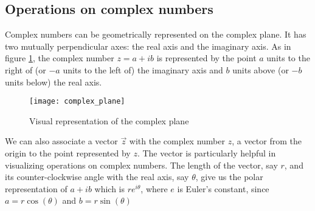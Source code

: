 \documentclass{report}
\begin{document}
\subsection{Operations on complex numbers}
Complex numbers can be geometrically represented on the complex plane. It has two mutually perpendicular axes: the real axis and the imaginary axis. As in figure \ref{fig:complex_plane}, the complex number $z=a+ib$ is represented by the point $a$ units to the right of (or $-a$ units to the left of) the imaginary axis and $b$ units above (or $-b$ units below) the real axis.
\begin{figure}
\texttt{[image: complex\_plane]}
\centering
\caption{Visual representation of the complex plane}
\label{fig:complex_plane}
\end{figure}
We can also associate a vector $\vec{z}$ with the complex number $z$, a vector from the origin to the point represented by $z$. The vector is particularly helpful in visualizing operations on complex numbers. The length of the vector, say $r$, and its counter-clockwise angle with the real axis, say $\theta$, give us the polar representation of $a+ib$ which is $re^{i\theta}$, where $e$ is Euler's constant, since $a=r\cos(\theta)$ and $b=r\sin(\theta)$
\end{document}
